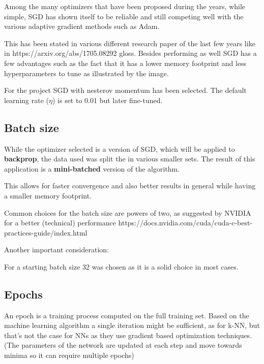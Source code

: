 Among the many optimizers that have been proposed during the years, while simple,
SGD has shown itself to be reliable and still competing well with the various adaptive gradient methods such as Adam.

This has been stated in various different research paper of the last few years like in https://arxiv.org/abs/1705.08292 {gloss}.
Besides performing as well SGD has a few advantages such as the fact that it has a lower memory footprint and less
hyperparameters to tune as illustrated by the image.

For the project SGD with nesterov momentum has been selected.
The default learning rate ($\eta$) is set to 0.01 but later fine-tuned.

\subsection{Batch size}
\label{subsec:batch-size}
While the optimizer selected is a version of SGD, which will be applied to \textbf{backprop}, the data used was split the
in various smaller sets. The result of this application is a \textbf{mini-batched} version of the algorithm.

This allows for faster convergence and also better results in general while having a smaller memory footprint.

Common choices for the batch size are powers of two, as suggested by NVIDIA for a better (technical) performance
https://docs.nvidia.com/cuda/cuda-c-best-practices-guide/index.html %

Another important consideration:
\cite*[https://arxiv.org/abs/1609.04836]{
    It has been observed in practice that when using a larger batch there is a degradation in the quality of the model,
    as measured by its ability to generalize [...]
}

For a starting batch size 32 was chosen as it is a solid choice in most cases.

\subsection{Epochs}
\label{subsec:epochs}
An epoch is a training process computed on the full training set.
Based on the machine learning algorithm a single iteration might be sufficient, as for k-NN, but that's not the
case for NNs as they use gradient based optimization techniques.
(The parameters of the network are updated at each step and move towards minima so it can require multiple epochs)

